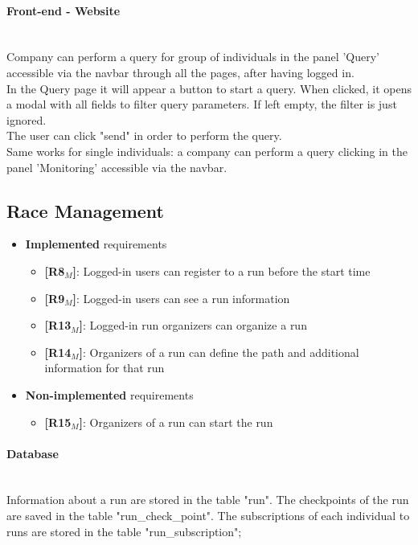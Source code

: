 \paragraph{Front-end - Website} \mbox{}\\
Company can perform a query for group of individuals in the panel 'Query' accessible via the navbar through all the pages, after having logged in.\\
In the Query page it will appear a button to start a query. When clicked, it opens a modal with all fields to filter query parameters.
If left empty, the filter is just ignored.\\
The user can click "send" in order to perform the query.\\
Same works for single individuals: a company can perform a query clicking in the panel 'Monitoring' accessible via the navbar.


\subsection{Race Management}
\begin{itemize}
    \item \textbf{Implemented} requirements
        \begin{itemize}
    \item \textbf{[R8$_M$]}: Logged-in users can register to a run before the start time
    \item \textbf{[R9$_M$]}: Logged-in users can see a run information
    \item \textbf{[R13$_M$]}: Logged-in run organizers can organize a run
    \item \textbf{[R14$_M$]}: Organizers of a run can define the path and additional information for that run

        \end{itemize}
    \item \textbf{Non-implemented} requirements
    \begin{itemize}
            \item \textbf{[R15$_M$]}: Organizers of a run can start the run
        \end{itemize}
\end{itemize}

\paragraph{Database} \mbox{}\\
Information about a run are stored in the table "run". The checkpoints of the run are saved in the table "run\_check\_point". The subscriptions of each individual to runs are stored in the table "run\_subscription";
